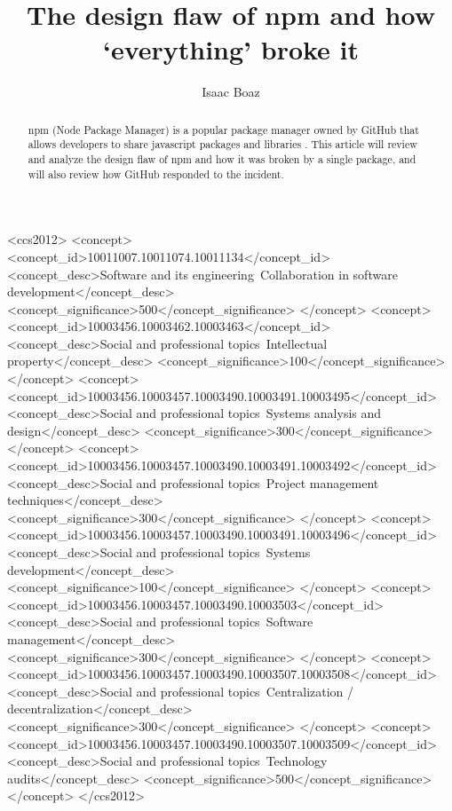 \documentclass[acmsmall]{acmart}
\begin{document}
\title{The design flaw of npm and how `everything' broke it}

\author{Isaac Boaz}

\renewcommand{\shortauthors}{Boaz}

\begin{abstract}
  npm (Node Package Manager) is a popular package manager owned by GitHub that
  allows developers to share javascript packages and libraries \cite{npm}. This
  article will review and analyze the design flaw of npm and how it was broken
  by a single package, and will also review how GitHub responded to the
  incident.
\end{abstract}


\begin{CCSXML}
  <ccs2012> <concept> <concept_id>10011007.10011074.10011134</concept_id>
  <concept_desc>Software and its engineering~Collaboration in software
  development</concept_desc> <concept_significance>500</concept_significance>
  </concept> <concept> <concept_id>10003456.10003462.10003463</concept_id>
  <concept_desc>Social and professional topics~Intellectual
  property</concept_desc> <concept_significance>100</concept_significance>
  </concept> <concept>
  <concept_id>10003456.10003457.10003490.10003491.10003495</concept_id>
  <concept_desc>Social and professional topics~Systems analysis and
  design</concept_desc> <concept_significance>300</concept_significance>
  </concept> <concept>
  <concept_id>10003456.10003457.10003490.10003491.10003492</concept_id>
  <concept_desc>Social and professional topics~Project management
  techniques</concept_desc> <concept_significance>300</concept_significance>
  </concept> <concept>
  <concept_id>10003456.10003457.10003490.10003491.10003496</concept_id>
  <concept_desc>Social and professional topics~Systems
  development</concept_desc> <concept_significance>100</concept_significance>
  </concept> <concept>
  <concept_id>10003456.10003457.10003490.10003503</concept_id>
  <concept_desc>Social and professional topics~Software
  management</concept_desc> <concept_significance>300</concept_significance>
  </concept> <concept>
  <concept_id>10003456.10003457.10003490.10003507.10003508</concept_id>
  <concept_desc>Social and professional topics~Centralization /
  decentralization</concept_desc>
  <concept_significance>300</concept_significance> </concept> <concept>
  <concept_id>10003456.10003457.10003490.10003507.10003509</concept_id>
  <concept_desc>Social and professional topics~Technology audits</concept_desc>
  <concept_significance>500</concept_significance> </concept> </ccs2012>
\end{CCSXML}
\end{document}
